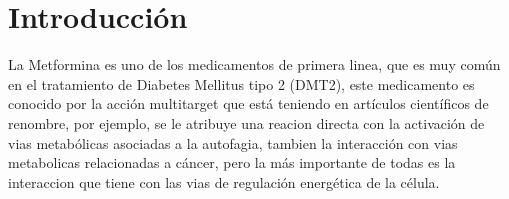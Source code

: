 \chapter{Introducción}
\label{Introduction}
La Metformina es uno de los medicamentos de primera linea, que es  muy común en el tratamiento de Diabetes Mellitus tipo 2 (DMT2), este medicamento es conocido por la acción multitarget que está teniendo en artículos científicos de renombre, por ejemplo, se le atribuye una reacion directa con la activación de vias metabólicas asociadas a la autofagia, tambien la interacción con vias metabolicas relacionadas a cáncer, pero la más importante de todas es la interaccion que tiene con las vias de regulación energética de la célula.\cite{Lei2017}
